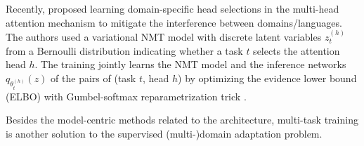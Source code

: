 Recently, \citet{Gong21pay,Gong21adaptive} proposed learning domain-specific head selections in the multi-head attention mechanism to mitigate the interference between domains/languages. The authors used a variational NMT model with discrete latent variables $z^{(h)}_t$ from a Bernoulli distribution indicating whether a task $t$ selects the attention head $h$. The training jointly learns the NMT model and the inference networks $q_{\theta^{(h)}_t}(z)$ of the pairs of (task $t$, head $h$) by optimizing the evidence lower bound (ELBO) \citep{kingma13variational} with Gumbel-softmax reparametrization trick \citep{jang17categorical}.

Besides the model-centric methods related to the architecture, multi-task training is another solution to the supervised (multi-)domain adaptation problem. 

